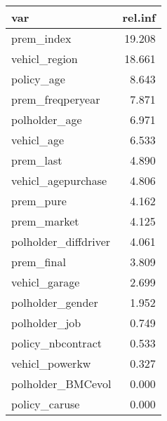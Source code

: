 \begin{table}[ht]
\centering
\caption{} 
\label{}
\begin{tabular}{lr}
  \hline
var & rel.inf \\ 
  \hline
prem\_index & 19.208 \\ 
  vehicl\_region & 18.661 \\ 
  policy\_age & 8.643 \\ 
  prem\_freqperyear & 7.871 \\ 
  polholder\_age & 6.971 \\ 
  vehicl\_age & 6.533 \\ 
  prem\_last & 4.890 \\ 
  vehicl\_agepurchase & 4.806 \\ 
  prem\_pure & 4.162 \\ 
  prem\_market & 4.125 \\ 
  polholder\_diffdriver & 4.061 \\ 
  prem\_final & 3.809 \\ 
  vehicl\_garage & 2.699 \\ 
  polholder\_gender & 1.952 \\ 
  polholder\_job & 0.749 \\ 
  policy\_nbcontract & 0.533 \\ 
  vehicl\_powerkw & 0.327 \\ 
  polholder\_BMCevol & 0.000 \\ 
  policy\_caruse & 0.000 \\ 
   \hline
\end{tabular}
\end{table}

